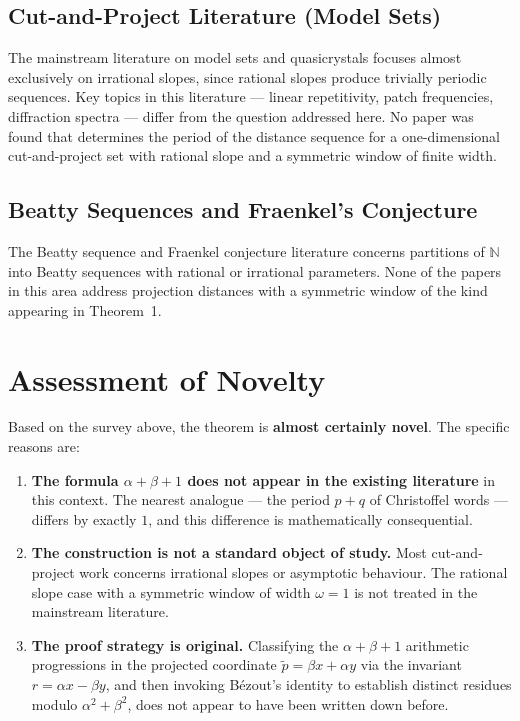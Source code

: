 \documentclass[11pt]{article}
\theoremstyle{plain}
\theoremstyle{remark}
\begin{document}
\subsection{Cut-and-Project Literature (Model Sets)}

The mainstream literature on model sets and quasicrystals
\cite{Senechal2009, HaynesEtAl2016} focuses almost exclusively on irrational slopes,
since rational slopes produce trivially periodic sequences.
Key topics in this literature --- linear repetitivity, patch frequencies, diffraction
spectra --- differ from the question addressed here.
No paper was found that determines the period of the distance sequence for a
one-dimensional cut-and-project set with rational slope and a symmetric window of
finite width.

\subsection{Beatty Sequences and Fraenkel's Conjecture}

The Beatty sequence and Fraenkel conjecture literature concerns partitions of
$\mathbb{N}$ into Beatty sequences with rational or irrational parameters.
None of the papers in this area address projection distances with a symmetric window
of the kind appearing in Theorem~1.

\section{Assessment of Novelty}

Based on the survey above, the theorem is \textbf{almost certainly novel}.
The specific reasons are:

\begin{enumerate}
    \item \textbf{The formula $\alpha + \beta + 1$ does not appear in the existing
          literature} in this context.
          The nearest analogue --- the period $p + q$ of Christoffel words --- differs
          by exactly $1$, and this difference is mathematically consequential.

    \item \textbf{The construction is not a standard object of study.}
          Most cut-and-project work concerns irrational slopes or asymptotic behaviour.
          The rational slope case with a symmetric window of width $\omega = 1$ is not
          treated in the mainstream literature.

    \item \textbf{The proof strategy is original.}
          Classifying the $\alpha + \beta + 1$ arithmetic progressions in the projected
          coordinate $\tilde{p} = \beta x + \alpha y$ via the invariant
          $r = \alpha x - \beta y$, and then invoking B\'{e}zout's identity to establish
          distinct residues modulo $\alpha^2 + \beta^2$, does not appear to have been
          written down before.
\end{enumerate}
\end{document}
